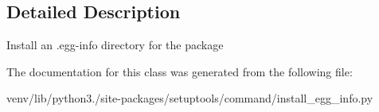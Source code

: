 \subsection{Detailed Description}
\begin{DoxyVerb}Install an .egg-info directory for the package\end{DoxyVerb}
 

The documentation for this class was generated from the following file\+:\begin{DoxyCompactItemize}
\item 
venv/lib/python3./site-\/packages/setuptools/command/install\+\_\+egg\+\_\+info.\+py\end{DoxyCompactItemize}
